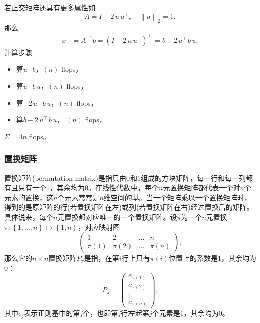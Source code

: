 \begin{subappendices}
若正交矩阵还具有更多属性如
\begin{equation*}
  A = I - 2 \, u \, u^{\top}, \quad \left\| u \right\|_{2} = 1,
\end{equation*}
那么
\begin{equation*}
  \begin{split}
    x & = A^{-1} b = \left( I - 2 \, u \, u^{\top} \right)^{\top} \,
    = b - 2 \, u^{\top} \, b \, u,
    \end{split}
\end{equation*}
计算步骤
\begin{itemize}
  \item 算$u^{\top} \, b$，$\left( n \right)$ flops，
  \item 算$u^{\top} \, b \, u $，$\left( n \right)$ flops，
  \item 算$-2 \, u^{\top} \, b \, u $，$\left( n \right)$ flops，
  \item 算$b - 2 \, u^{\top} \, b \, u$， $\left( n \right)$ flops，
\end{itemize}
$\Sigma = 4n$ flops。

\subsubsection{置换矩阵}
\label{sec:numlin-matrix-permutation}
置换矩阵(permutation matrix)是指只由$0$和$1$组成的方块矩阵，每一行和每一列都有且只有一个$1$，其余均为$0$。在线性代数中，每个$n$元置换矩阵都代表一个对$n$个元素的置换，这$n$个元素常常是$n$维空间的基。当一个矩阵乘以一个置换矩阵时，得到的是原矩阵的行(若置换矩阵在左)或列(若置换矩阵在右)经过置换后的矩阵。具体说来，每个$n$元置换都对应唯一的一个置换矩阵。设$\pi$为一个$n$元置换$\pi: \left\{ 1,\ldots,n \right\} \mapsto \left\{ 1, n \right\}$，对应映射图
\begin{equation*}
  \begin{pmatrix}
    1 & 2 & \ldots & n \\
    \pi(1) & \pi(2) & \ldots & \pi(n)
  \end{pmatrix},
\end{equation*}
那么它的$n \times n$置换矩阵$P_{\pi}$是指，在第$i$行上只有$\pi(i)$位置上的系数是$1$，其余均为$0$：
\begin{equation}
  \label{eq:numlin-matrix-permutation}
  P_{\pi} = \begin{pmatrix}
  e_{\pi(1)} \\e_{\pi(2)} \\ \vdots \\ e_{\pi(n)}
  \end{pmatrix},
\end{equation}
其中$e_{j}$表示正则基中的第$j$个，也即第$j$行左起第$j$个元素是$1$，其余均为$0$。


\end{subappendices}

